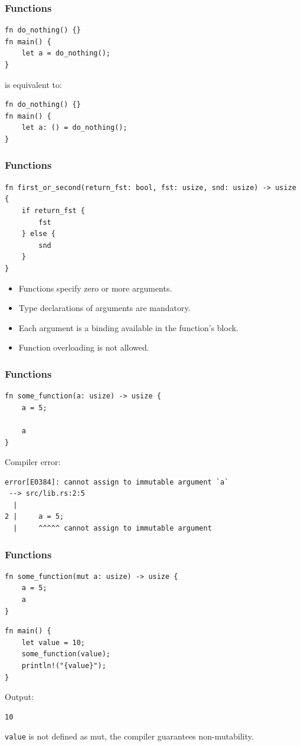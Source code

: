 \begin{frame}[fragile]
    \frametitle{Functions}
    
    \begin{verbatim}
fn do_nothing() {}
fn main() {
    let a = do_nothing();
}
    \end{verbatim}
    \pause
    \vfill
    is equivalent to:
    \begin{verbatim}
fn do_nothing() {}
fn main() {
    let a: () = do_nothing();
}
    \end{verbatim}
\end{frame}

\begin{frame}[fragile]
    \frametitle{Functions}
    \begin{verbatim}
fn first_or_second(return_fst: bool, fst: usize, snd: usize) -> usize {
    if return_fst {
        fst
    } else {
        snd
    }
}
    \end{verbatim}
    \pause
    \vfill
    \begin{itemize}
        \item Functions specify zero or more arguments.
        \item Type declarations of arguments are mandatory.
        \item Each argument is a binding available in the function's block.
        \pause
        \item Function overloading is not allowed.
    \end{itemize}
\end{frame}

\begin{frame}[fragile]
    \frametitle{Functions}
    \begin{verbatim}
fn some_function(a: usize) -> usize {
    a = 5;

    a
}
    \end{verbatim}
    \pause
    \vfill
    Compiler error:
    \begin{verbatim}
error[E0384]: cannot assign to immutable argument `a`
 --> src/lib.rs:2:5
  |
2 |     a = 5;
  |     ^^^^^ cannot assign to immutable argument
    \end{verbatim}
\end{frame}

\begin{frame}[fragile]
    \frametitle{Functions}
    \begin{verbatim}
fn some_function(mut a: usize) -> usize {
    a = 5;
    a
}
    \end{verbatim}
    \pause
    \vfill
    \begin{verbatim}
fn main() {
    let value = 10;
    some_function(value);
    println!("{value}");
}
    \end{verbatim}
    Output:
    \pause
    \vfill
    \begin{verbatim}
10
    \end{verbatim}
    \pause
    \vfill
    \texttt{value} is not defined as mut, the compiler guarantees non-mutability.
\end{frame}


